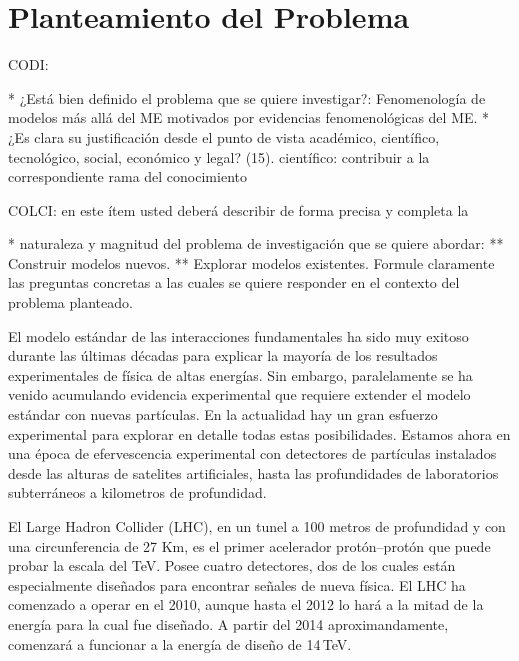 \section{Planteamiento del Problema }
\begin{instrucciones}
  CODI: 

  * ¿Está bien definido el problema que se quiere investigar?:
  Fenomenología de modelos más allá del ME motivados por evidencias
  fenomenológicas del ME.  
  * ¿Es clara su justificación desde el punto de vista académico,
  científico, tecnológico, social, económico y legal? (15).
  científico: contribuir a la correspondiente rama del conocimiento

  COLCI: en este ítem usted deberá describir de forma precisa y completa la
  
  * naturaleza y magnitud del problema de investigación que se quiere
  abordar:
  ** Construir modelos nuevos.
  ** Explorar modelos existentes.
  Formule claramente las preguntas concretas a las cuales se
  quiere responder en el contexto del problema planteado.
\end{instrucciones}
El modelo estándar de las interacciones fundamentales ha sido muy
exitoso durante las últimas décadas para explicar la mayoría de los
resultados experimentales de física de altas energías. Sin embargo,
paralelamente se ha venido acumulando evidencia experimental que
requiere extender el modelo estándar con nuevas partículas. En la
actualidad hay un gran esfuerzo experimental para explorar en detalle
todas estas posibilidades. Estamos ahora en una época de efervescencia
experimental con detectores de partículas instalados desde las alturas
de satelites artificiales, hasta las profundidades de laboratorios
subterráneos a kilometros de profundidad.

El Large Hadron Collider (LHC), en un tunel a 100 metros de profundidad y
con una circunferencia de 27 Km, es el primer acelerador
protón--protón que puede probar la escala del TeV.  Posee cuatro
detectores, dos de los cuales están especialmente diseñados para
encontrar señales de nueva física. El LHC  ha comenzado a
operar en el 2010, aunque hasta el 2012 lo hará a la mitad de la
energía para la cual fue diseñado. A partir del 2014 aproximandamente, comenzará a funcionar a la energía de diseño de 14\,TeV.

